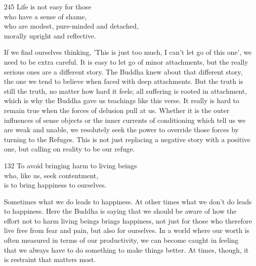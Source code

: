 
\begin{dhpVerse}{245}
\label{dhp-245}
Life is not easy for those\\
who have a sense of shame,\\
who are modest, pure-minded and detached,\\
morally upright and reflective.
\end{dhpVerse}

\begin{dhpRefl}
  If we find ourselves thinking, 'This is just too much, I can't let go of this
  one', we need to be extra careful. It is easy to let go of minor attachments,
  but the really serious ones are a different story. The Buddha knew about that
  different story, the one we tend to believe when faced with deep attachments.
  But the truth is still the truth, no matter how hard it feels; all suffering
  is rooted in attachment, which is why the Buddha gave us teachings like this
  verse. It really is hard to remain true when the forces of delusion pull at
  us. Whether it is the outer influences of sense objects or the inner currents
  of conditioning which tell us we are weak and unable, we resolutely seek the
  power to override those forces by turning to the Refuges. This is not just
  replacing a negative story with a positive one, but calling on reality to be
  our refuge.
\end{dhpRefl}


\begin{dhpVerse}{132}
\label{dhp-132}
To avoid bringing harm to living beings\\
who, like us, seek contentment,\\
is to bring happiness to ourselves.
\end{dhpVerse}

\begin{dhpRefl}
  Sometimes what we do leads to happiness. At other times what we don’t do leads
  to happiness. Here the Buddha is saying that we should be aware of how the
  effort not to harm living beings brings happiness, not just for those who
  therefore live free from fear and pain, but also for ourselves. In a world
  where our worth is often measured in terms of our productivity, we can become
  caught in feeling that we always have to do something to make things better.
  At times, though, it is restraint that matters most.
\end{dhpRefl}

